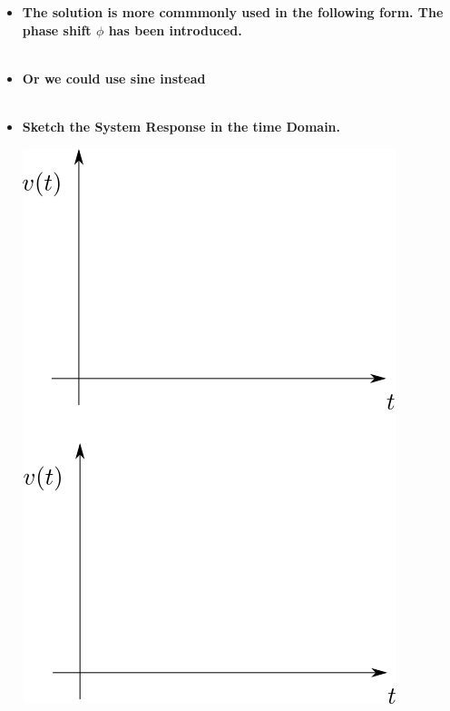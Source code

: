 \documentclass[11pt]{article}
\begin{document}
\begin{itemize}
\begin{itemize}
	 \vspace{3mm}\\

\item \textbf{\large The solution is more commmonly used in the following form. The phase shift $\phi$ has been introduced. } \vspace{3mm}\\

	 \\

\item \textbf{\large Or we could use sine instead}\vspace{3mm}\\

 \\


	\newpage
\item \textbf{ \Large Sketch the System Response in the time Domain.}

\includegraphics[scale=1]{lecture1_fig1.png} \\


\end{itemize}
\end{itemize}
\end{document}
